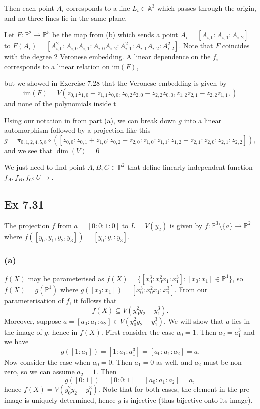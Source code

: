 \documentclass{article}
\theoremstyle{definition}
\renewcommand{\P}{\mathbb{P}}
\newcommand{\A}{\mathbb{A}}
\renewcommand{\AA}[1]{\A^{#1}}
\newcommand{\PP}[1]{\P^{#1}}
\newcommand{\im}{\text{im}}
\begin{document}
Then each point $A_i$ corresponds to a line
$L_i \in \AA{3}$ which passes through the origin, and no three lines lie in the
same plane.


Let $F : \PP{2} \to \PP{5}$ be the map from (b) which sends a point $A_i=[A_{i,
0}:A_{i, 1}:A_{i, 2}]$ to $F(A_i) = [A_{i, 0}^{2} : A_{i, 0}A_{i, 1} : A_{i,
0}A_{i, 2} : A_{i, 1}^{2} : A_{i, 1}A_{i, 2} : A_{i, 2}^{2}]$. Note that $F$
coincides with the degree $2$ Veronese embedding. A linear dependence on the
$f_i$ corresponds to a linear relation on $\im(F)$, 

but we showed in Exercise
7.28 that the Veronese embedding is given by
\[
	\im(F) 
	= 
	V(
		z_{0,1}z_{1,0} - z_{1, 1}z_{0,0},
		z_{0,2}z_{2,0} - z_{2, 2}z_{0,0},
		z_{1,2}z_{2,1} - z_{2, 2}z_{1,1},
	)
\]
and none of the polynomials inside t


Using our notation in from part (a), we can break down $g$
into a linear automorphism followed by a projection like this
\[
	g 
	= 
	\pi_{0,1,2,4,5,8} \circ 
	([z_{0,0}:z_{0,1}+z_{1, 0}:z_{0,2}+z_{2, 0}:z_{1,0}:
	z_{1,1}:z_{1,2}+z_{2,1}:z_{2,0}:z_{2,1}:z_{2,2}]),
\] 
and we see that $\dim(V) = 6$ 

We just need to find point $A, B, C \in \PP{2}$ that define linearly
independent function $f_A, f_B, f_C : U \to$. 


\subsection*{Ex 7.31}

The projection $f$ from $a = [0 : 0 : 1 : 0]$ to $L = V(y_2)$ is given by $f :
\PP{3} \setminus \{ a \} \to \PP{2}$ where $f([y_0, y_1, y_2, y_3]) = [y_0 :
y_1 : y_3]$. \\

\subsubsection*{(a)}

$f(X)$ may be parameterised as $f(X) = \{ [x_0^{3} : x_0^{2} x_1 : x_1^{3}] :
[x_0:x_1] \in \PP{1} \}$, so $f(X) = g(\PP{1})$ where $g([x_0:x_1]) = [x_0^{3}
: x_0^{2}x_1 : x_1^{3}]$. From our parameterisation of $f$, it follows that
\[
	f(X) \subseteq V(y_0^{2}y_2 - y_1^{3}).
\] 
Moreover, suppose $a = [a_0 : a_1 : a_2]\in V(y_0^{2}y_2 - y_1^{3})$. We will
show that $a$ lies in the image of $g$, hence in $f(X)$. First consider the
case $a_0 = 1$. Then $a_2 = a_1^{3}$ and we have
\[
	g([1 : a_1]) = [1 : a_1 : a_1^{3}]  = [a_0 : a_1 : a_2] = a.
\]
Now consider the case when $a_0 = 0$. Then $a_1 = 0$ as well, and $a_2$ must be
non-zero, so we can assume $a_2 = 1$. Then
\[
	g([0 : 1]) = [0 : 0 : 1] = [a_0 : a_1 : a_2] = a,
\]
hence $f(X) = V(y_0^{2}y_2 - y_1^{3})$. Note that for both cases, the element
in the pre-image is uniquely determined, hence $g$ is injective (thus bijective
onto its image). 
\end{document}
